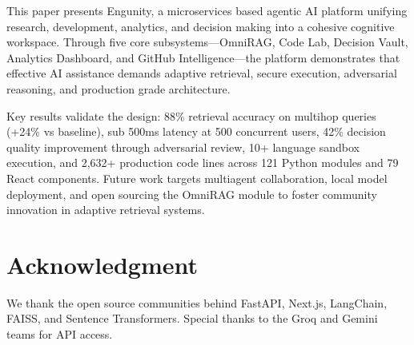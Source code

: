 \documentclass[conference]{IEEEtran}
\begin{document}
This paper presents Engunity, a microservices based agentic AI platform unifying research, development, analytics, and decision making into a cohesive cognitive workspace. Through five core subsystems—OmniRAG, Code Lab, Decision Vault, Analytics Dashboard, and GitHub Intelligence—the platform demonstrates that effective AI assistance demands adaptive retrieval, secure execution, adversarial reasoning, and production grade architecture.

Key results validate the design: 88\% retrieval accuracy on multihop queries (+24\% vs baseline), sub 500ms latency at 500 concurrent users, 42\% decision quality improvement through adversarial review, 10+ language sandbox execution, and 2,632+ production code lines across 121 Python modules and 79 React components. Future work targets multiagent collaboration, local model deployment, and open sourcing the OmniRAG module to foster community innovation in adaptive retrieval systems.

\section*{Acknowledgment}
We thank the open source communities behind FastAPI, Next.js, LangChain, FAISS, and Sentence Transformers. Special thanks to the Groq and Gemini teams for API access.
\end{document}
